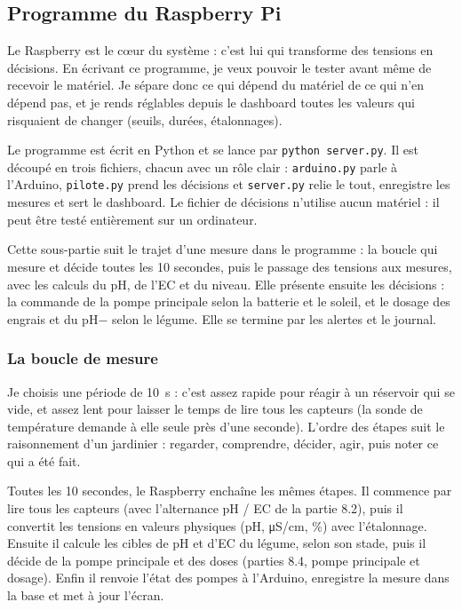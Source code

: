 \subsection{Programme du Raspberry Pi}

Le Raspberry est le cœur du système : c'est lui qui transforme des tensions en décisions. En écrivant ce programme, je veux pouvoir le tester avant même de recevoir le matériel. Je sépare donc ce qui dépend du matériel de ce qui n'en dépend pas, et je rends réglables depuis le dashboard toutes les valeurs qui risquaient de changer (seuils, durées, étalonnages).

Le programme est écrit en Python et se lance par \texttt{python server.py}. Il est découpé en trois fichiers, chacun avec un rôle clair : \texttt{arduino.py} parle à l'Arduino, \texttt{pilote.py} prend les décisions et \texttt{server.py} relie le tout, enregistre les mesures et sert le dashboard. Le fichier de décisions n'utilise aucun matériel : il peut être testé entièrement sur un ordinateur.

Cette sous-partie suit le trajet d'une mesure dans le programme : la boucle qui mesure et décide toutes les 10 secondes, puis le passage des tensions aux mesures, avec les calculs du pH, de l'EC et du niveau. Elle présente ensuite les décisions : la commande de la pompe principale selon la batterie et le soleil, et le dosage des engrais et du pH$-$ selon le légume. Elle se termine par les alertes et le journal.

\subsubsection*{La boucle de mesure}

Je choisis une période de \qty{10}{s} : c'est assez rapide pour réagir à un réservoir qui se vide, et assez lent pour laisser le temps de lire tous les capteurs (la sonde de température demande à elle seule près d'une seconde). L'ordre des étapes suit le raisonnement d'un jardinier : regarder, comprendre, décider, agir, puis noter ce qui a été fait.

Toutes les 10 secondes, le Raspberry enchaîne les mêmes étapes. Il commence par lire tous les capteurs (avec l'alternance pH / EC de la partie 8.2), puis il convertit les tensions en valeurs physiques (pH, \unit{\micro S/cm}, \%) avec l'étalonnage. Ensuite il calcule les cibles de pH et d'EC du légume, selon son stade, puis il décide de la pompe principale et des doses (parties 8.4, pompe principale et dosage). Enfin il renvoie l'état des pompes à l'Arduino, enregistre la mesure dans la base et met à jour l'écran.

